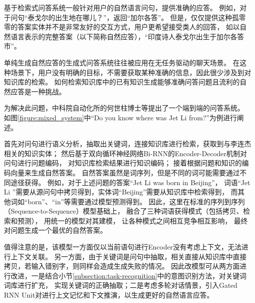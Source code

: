 基于检索式问答系统一般针对用户的自然语言问句，提供准确的应答。
例如，对于问句“泰戈尔的出生地在哪儿？”，返回“加尔各答”。
但是，仅仅提供这种孤零零的答案实体并不是非常友好的交互方式，用户更希望接受类人的回答，
如以自然语言表示的完整答案（以下简称自然应答），“印度诗人泰戈尔出生于加尔各答市”。

单纯生成自然应答的生成式问答系统往往被应用在无任务驱动的聊天场景。
在这种场景下，用户没有明确的目标，不需要获取某种准确的信息，因此很少涉及到对知识库的检索。
如何检索知识库中的已有知识生成能够准确问答问题且流利的自然应答是一种挑战。


为解决此问题，中科院自动化所的何世柱博士等\citep{hegenerating}提出了一个端到端的问答系统。
如图\ref{figure:mixed_system}中“Do you know where was Jet Li from?”为例进行阐述。

首先对问句进行语义分析，抽取出关键词，连接知识库进行检索，获取到与李连杰相关的知识实体；
然后基于双向循环神经网络Bi-RNN的Encoder-Decoder机制对问句进行问题编码，
对知识库检索结果进行知识编码；
接着根据问题和知识的编码向量来生成自然答案。
自然答案虽然是词序列，但是不同的词可能需要通过不同途径获得。
例如，对于上述问题的答案“Jet Li was born in Beijing”，
词语“Jet Li ”需要从源问句中拷贝得到，实体词“Beijing”需要从知识库中检索得到，
而其他词如“born”、“in”等需要通过模型预测得到。
因此，这里在标准的序列到序列（Sequence-to-Sequence）模型基础上，
融合了三种词语获得模式（包括拷贝、检索和预测），
用统一的模型对其建模，
让各种模式之间相互竞争相互影响，
最终对问题生成一个最优的自然答案。

值得注意的是，该模型一方面仅以当前语句进行Encoder没有考虑上下文，无法进行上下文关联。
另一方面，由于关键词是问句中抽取，相关直接从知识库中直接拷贝，若输入错别字，则同样会造成生成失败的情况。
因此改模型可从两方面进行改进，一是结合小节\ref{subsection:task-recognition}中的意图识别方法，对关键词词库进行扩充，
实现关键词的正确抽取；二是考虑多轮对话情景，引入Gated RNN Unit对进行上文记忆和下文推演，以生成更好的自然语言应答。